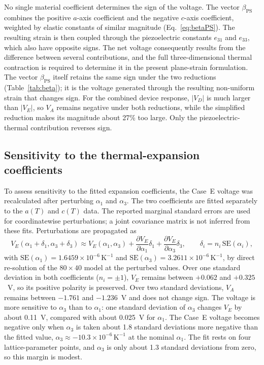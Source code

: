 \documentclass[a4paper,12pt]{elsarticle}
\begin{document}
No single material coefficient determines the sign of the voltage. The
vector $\beta_{\mathrm{PS}}$ combines the positive $a$-axis coefficient and the
negative $c$-axis coefficient, weighted by elastic constants of similar magnitude
(Eq.~\eqref{eq:betaPS}). The resulting strain is then coupled through the
piezoelectric constants $e_{31}$ and $e_{33}$, which also have opposite signs. The
net voltage consequently results from the difference between several contributions,
and the full three-dimensional thermal contraction is required to determine it in the
present plane-strain formulation. The vector $\beta_{\mathrm{PS}}$ itself retains the
same sign under the two reductions (Table~\ref{tab:beta}); it is the voltage generated
through the resulting non-uniform strain that changes sign.
For the combined device response, $|V_D|$ is much larger than $|V_E|$, so $V_A$
remains negative under both reductions, while the simplified reduction makes its
magnitude about 27\% too large. Only the piezoelectric-thermal contribution reverses sign.

\subsection{Sensitivity to the thermal-expansion coefficients}
\label{sec:alpha}

To assess sensitivity to the fitted expansion coefficients, the
Case~E voltage was recalculated after perturbing $\alpha_1$ and $\alpha_3$. The two coefficients are
fitted separately to the $a(T)$ and $c(T)$ data. The reported marginal standard
errors are used for coordinatewise perturbations; a joint covariance matrix
is not inferred from these fits.
Perturbations are propagated as
\begin{equation}
V_E(\alpha_1+\delta_1,\alpha_3+\delta_3)\approx
V_E(\alpha_1,\alpha_3)
+\frac{\partial V_E}{\partial\alpha_1}\delta_1
+\frac{\partial V_E}{\partial\alpha_3}\delta_3,
\qquad
\delta_i=n_i\,\mathrm{SE}(\alpha_i),
\label{eq:uncertaintyprop}
\end{equation}
with $\mathrm{SE}(\alpha_1)=1.6459\times10^{-6}\,\text{K}^{-1}$ and
$\mathrm{SE}(\alpha_3)=3.2611\times10^{-6}\,\text{K}^{-1}$, by direct re-solution of
the $80\times40$ model at the perturbed values. Over one standard deviation in both
coefficients ($n_i=\pm1$), $V_E$ remains between $+0.062$ and $+0.325$~V, so its
positive polarity is preserved. Over two standard deviations, $V_A$ remains between
$-1.761$ and $-1.236$~V and does not change sign. The voltage is more sensitive to
$\alpha_3$ than to $\alpha_1$: one standard deviation of $\alpha_3$ changes $V_E$ by
about 0.11~V, compared with about 0.025~V for $\alpha_1$. The Case~E voltage becomes
negative only when $\alpha_3$ is taken about 1.8 standard deviations more negative
than the fitted value, $\alpha_3\approx-10.3\times10^{-6}\,\text{K}^{-1}$ at the nominal $\alpha_1$. The fit rests on four lattice-parameter points, and $\alpha_3$ is only about 1.3 standard deviations from zero, so this margin is modest.
\end{document}
